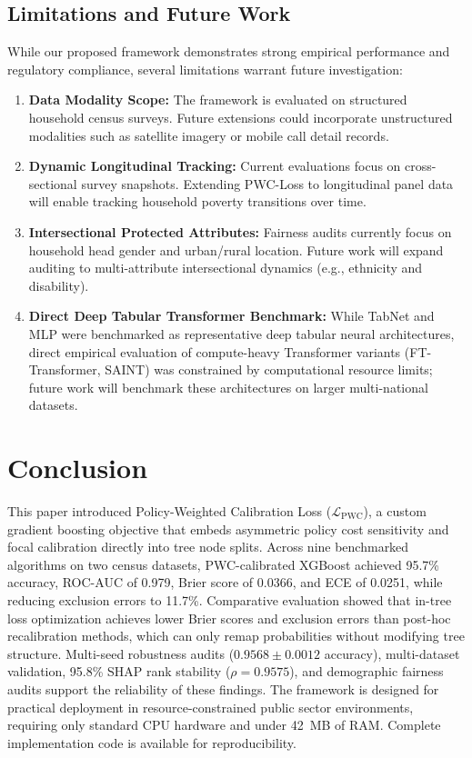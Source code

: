 \documentclass[conference]{IEEEtran}
\begin{document}
\subsection{Limitations and Future Work}
While our proposed framework demonstrates strong empirical performance and regulatory compliance, several limitations warrant future investigation:
\begin{enumerate}
\item \textbf{Data Modality Scope:} The framework is evaluated on structured household census surveys. Future extensions could incorporate unstructured modalities such as satellite imagery or mobile call detail records.
\item \textbf{Dynamic Longitudinal Tracking:} Current evaluations focus on cross-sectional survey snapshots. Extending PWC-Loss to longitudinal panel data will enable tracking household poverty transitions over time.
\item \textbf{Intersectional Protected Attributes:} Fairness audits currently focus on household head gender and urban/rural location. Future work will expand auditing to multi-attribute intersectional dynamics (e.g., ethnicity and disability).
\item \textbf{Direct Deep Tabular Transformer Benchmark:} While TabNet and MLP were benchmarked as representative deep tabular neural architectures, direct empirical evaluation of compute-heavy Transformer variants (FT-Transformer, SAINT) was constrained by computational resource limits; future work will benchmark these architectures on larger multi-national datasets.
\end{enumerate}


\section{Conclusion}

This paper introduced Policy-Weighted Calibration Loss ($\mathcal{L}_{\text{PWC}}$), a custom gradient boosting objective that embeds asymmetric policy cost sensitivity and focal calibration directly into tree node splits. Across nine benchmarked algorithms on two census datasets, PWC-calibrated XGBoost achieved 95.7\% accuracy, ROC-AUC of 0.979, Brier score of 0.0366, and ECE of 0.0251, while reducing exclusion errors to 11.7\%. Comparative evaluation showed that in-tree loss optimization achieves lower Brier scores and exclusion errors than post-hoc recalibration methods, which can only remap probabilities without modifying tree structure. Multi-seed robustness audits ($0.9568 \pm 0.0012$ accuracy), multi-dataset validation, 95.8\% SHAP rank stability ($\rho = 0.9575$), and demographic fairness audits support the reliability of these findings. The framework is designed for practical deployment in resource-constrained public sector environments, requiring only standard CPU hardware and under 42~MB of RAM. Complete implementation code is available for reproducibility.
\end{document}
